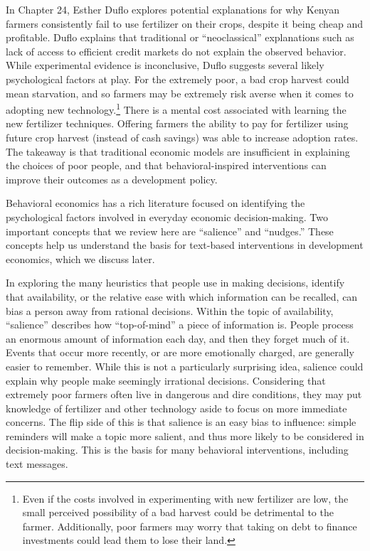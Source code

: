 \documentclass[12pt]{article}
\begin{document}
In \textcite{banerjee_understanding_2006} Chapter 24, Esther Duflo explores potential explanations for why Kenyan farmers consistently fail to use fertilizer on their crops, despite it being cheap and profitable. Duflo explains that traditional or ``neoclassical'' explanations such as lack of access to efficient credit markets do not explain the observed behavior. While experimental evidence is inconclusive, Duflo suggests several likely psychological factors at play. For the extremely poor, a bad crop harvest could mean starvation, and so farmers may be extremely risk averse when it comes to adopting new technology.\footnote{Even if the costs involved in experimenting with new fertilizer are low, the small perceived possibility of a bad harvest could be detrimental to the farmer. Additionally, poor farmers may worry that taking on debt to finance investments could lead them to lose their land.} There is a mental cost associated with learning the new fertilizer techniques. Offering farmers the ability to pay for fertilizer using future crop harvest (instead of cash savings) was able to increase adoption rates. The takeaway is that traditional economic models are insufficient in explaining the choices of poor people, and that behavioral-inspired interventions can improve their outcomes as a development policy. 

Behavioral economics has a rich literature focused on identifying the psychological factors involved in everyday economic decision-making. Two important concepts that we review here are ``salience'' and ``nudges.'' These concepts help us understand the basis for text-based interventions in development economics, which we discuss later.

In exploring the many heuristics that people use in making decisions, \textcite{tversky_judgment_1974} identify that availability, or the relative ease with which information can be recalled, can bias a person away from rational decisions. Within the topic of availability, ``salience'' describes how ``top-of-mind'' a piece of information is. People process an enormous amount of information each day, and then they forget much of it. Events that occur more recently, or are more emotionally charged, are generally easier to remember. While this is not a particularly surprising idea, salience could explain why people make seemingly irrational decisions. Considering that extremely poor farmers often live in dangerous and dire conditions, they may put knowledge of fertilizer and other technology aside to focus on more immediate concerns. The flip side of this is that salience is an easy bias to influence: simple reminders will make a topic more salient, and thus more likely to be considered in decision-making. This is the basis for many behavioral interventions, including text messages.
\end{document}
